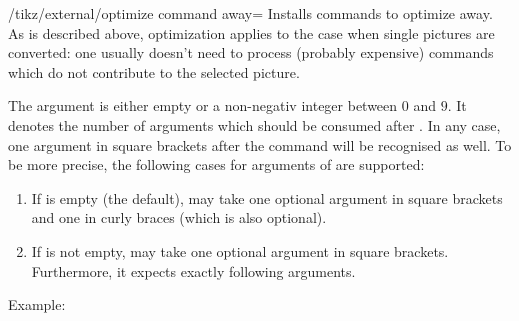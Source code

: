 {

\begin{key}{/tikz/external/optimize command away=}
	Installs commands to optimize  away. As is described above, optimization applies to the case when single pictures are converted: one usually doesn't need to process (probably expensive) commands which do not contribute to the selected picture.

	The argument  is either empty or a non-negativ integer between $0$ and $9$. It denotes the number of arguments which should be consumed after . In any case, one argument in square brackets after the command will be recognised as well. To be more precise, the following cases for arguments of  are supported:
	\begin{enumerate}
		\item If  is empty (the default),  may take one optional argument in square brackets and one in curly braces (which is also optional).
		\item If  is not empty,  may take one optional argument in square brackets. Furthermore, it expects exactly  following arguments.
	\end{enumerate}

	Example:
\begin{codeexample}
\tikzset{external/optimize command away=\includegraphics}
\end{codeexample}

\begin{codeexample}
\newcommand{\myExpensiveMacro}[1]{Very expensive!}


\end{codeexample}
\end{key}}
